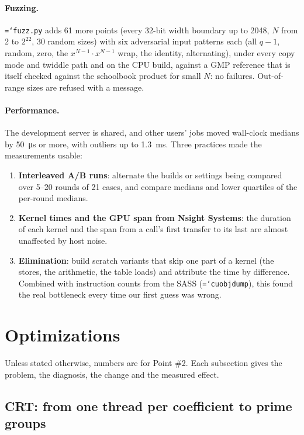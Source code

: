 \documentclass[11pt,a4paper]{article}
\newcommand{\code}[1]{\texttt{\hyphenchar\font=`\-\relax #1}}
\newcommand{\us}[1]{\SI{#1}{\micro\second}}
\newcommand{\ms}[1]{\SI{#1}{\milli\second}}
\begin{document}
\paragraph{Fuzzing.} \code{fuzz.py} adds 61 more points (every 32-bit width boundary up
to 2048, $N$ from 2 to $2^{22}$, 30 random sizes) with six adversarial input patterns
each (all $q-1$, random, zero, the $x^{N-1}\cdot x^{N-1}$ wrap, the identity, alternating),
under every copy mode and twiddle path and on the CPU build, against a GMP reference
that is itself checked against the schoolbook product for small $N$: no failures.
Out-of-range sizes are refused with a message.

\paragraph{Performance.} The development server is shared, and other users' jobs
moved wall-clock medians by \us{50} or more, with outliers up to \ms{1.3}. Three
practices made the measurements usable:
\begin{enumerate}[leftmargin=*]
\item \textbf{Interleaved A/B runs}: alternate the builds or settings being compared
  over 5--20 rounds of 21 cases, and compare medians and lower quartiles of the
  per-round medians.
\item \textbf{Kernel times and the GPU span from Nsight Systems}: the duration of each
  kernel and the span from a call's first transfer to its last are almost
  unaffected by host noise.
\item \textbf{Elimination}: build scratch variants that skip one part of a kernel
  (the stores, the arithmetic, the table loads) and attribute the time by difference.
  Combined with instruction counts from the SASS (\code{cuobjdump}), this found
  the real bottleneck every time our first guess was wrong.
\end{enumerate}

\section{Optimizations}

Unless stated otherwise, numbers are for Point \#2. Each subsection gives the
problem, the diagnosis, the change and the measured effect.

\subsection{CRT: from one thread per coefficient to prime groups}
\end{document}
